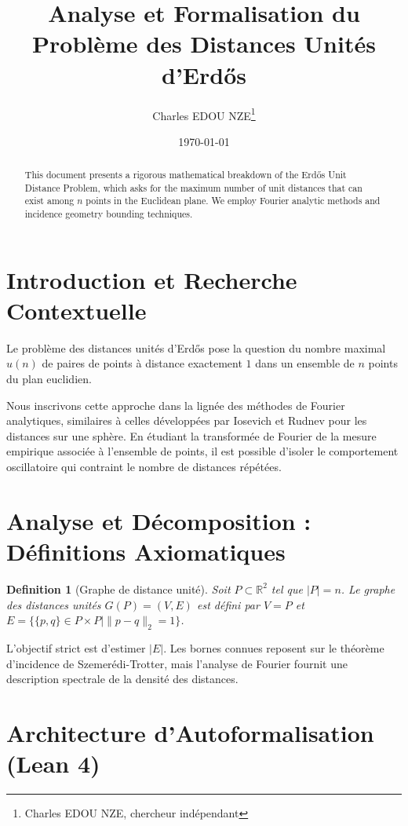 \documentclass[11pt,a4paper]{article}
\title{Analyse et Formalisation du Problème des Distances Unités d'Erd\H{o}s}
\author{Charles EDOU NZE\thanks{Charles EDOU NZE, chercheur indépendant}}
\date{\today}
\newtheorem{definition}{Definition}
\begin{document}
\maketitle
\begin{abstract}
This document presents a rigorous mathematical breakdown of the Erd\H{o}s Unit Distance Problem, which asks for the maximum number of unit distances that can exist among $n$ points in the Euclidean plane. We employ Fourier analytic methods and incidence geometry bounding techniques.
\end{abstract}

\tableofcontents
\newpage
\section{Introduction et Recherche Contextuelle}

Le problème des distances unités d'Erd\H{o}s pose la question du nombre maximal $u(n)$ de paires de points à distance exactement $1$ dans un ensemble de $n$ points du plan euclidien.

Nous inscrivons cette approche dans la lignée des méthodes de Fourier analytiques, similaires à celles développées par Iosevich et Rudnev pour les distances sur une sphère. En étudiant la transformée de Fourier de la mesure empirique associée à l'ensemble de points, il est possible d'isoler le comportement oscillatoire qui contraint le nombre de distances répétées.

\section{Analyse et Décomposition : Définitions Axiomatiques}

\begin{definition}[Graphe de distance unité]
Soit $P \subset \mathbb{R}^2$ tel que $|P| = n$. Le graphe des distances unités $G(P) = (V, E)$ est défini par $V = P$ et $E = \{ \{p, q\} \in P \times P \mid \|p - q\|_2 = 1 \}$.
\end{definition}

L'objectif strict est d'estimer $|E|$. Les bornes connues reposent sur le théorème d'incidence de Szemerédi-Trotter, mais l'analyse de Fourier fournit une description spectrale de la densité des distances.

\section{Architecture d'Autoformalisation (Lean 4)}
\end{document}
